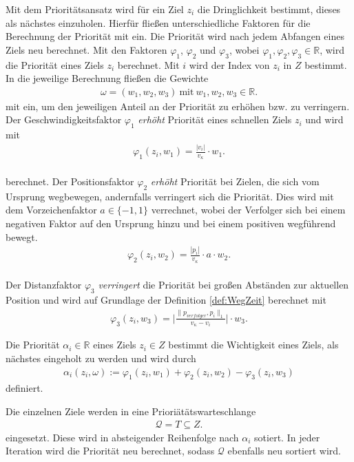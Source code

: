 \documentclass[german,version-2019-11]{uzl-thesis}
\begin{document}
Mit dem Prioritätsansatz wird für ein Ziel $z_i$ die Dringlichkeit bestimmt, dieses als nächstes einzuholen. Hierfür fließen unterschiedliche Faktoren für die Berechnung der Priorität mit ein. Die Priorität wird nach jedem Abfangen eines Ziels neu berechnet. Mit den Faktoren $\varphi_1$, $\varphi_2$ und $\varphi_3$, wobei $\varphi_1,\varphi_2,\varphi_3\in\mathbb{R}$, wird die Priorität eines Ziels $z_i$ berechnet. Mit $i$ wird der Index von $z_i$ in $Z$ bestimmt. In die jeweilige Berechnung fließen die Gewichte
\begin{align*}
\omega = (w_1, w_2 ,w_3)~\text{mit}~w_1,w_2,w_3\in\mathbb{R}.
\end{align*}
mit ein, um den jeweiligen Anteil an der Priorität zu erhöhen bzw. zu verringern.\\
Der Geschwindigkeitsfaktor $\varphi_1$ \emph{erhöht} Priorität eines schnellen Ziels $z_i$ und wird mit 
\begin{align}
\varphi_1(z_i, w_1) = \frac{|v_i|}{v_{\kappa}}\cdot w_1.
\end{align}\\
berechnet.
\label{def:FaktorPos}
Der Positionsfaktor $\varphi_2$ \emph{erhöht} Priorität bei Zielen, die sich vom Ursprung wegbewegen, andernfalls verringert sich die Priorität. Dies wird mit dem Vorzeichenfaktor $a\in\{-1,1\}$ verrechnet, wobei der Verfolger sich bei einem negativen Faktor auf den Ursprung hinzu und bei einem positiven wegführend bewegt.
\begin{align}
\varphi_2(z_i, w_2) = \frac{|p_i|}{v_{\kappa}}\cdot a \cdot w_2.
\end{align}\\
Der Distanzfaktor $\varphi_3$ \emph{verringert} die Priorität bei großen Abständen zur aktuellen Position und wird auf Grundlage der Definition \ref{def:WegZeit} berechnet mit
\begin{align}
\varphi_3(z_i, w_3) = \bigg\vert\frac{\|p_{verfolger},p_i\|_1}{v_{\kappa}-v_i}\bigg\vert \cdot w_3.
\end{align}
\begin{definition}
Die Priorität $\alpha_i\in\mathbb{R}$ eines Ziels $z_i\in Z$ bestimmt die Wichtigkeit eines Ziels, als nächstes eingeholt zu werden und wird durch
\begin{align*}
\alpha_i(z_i, \omega) := \varphi_1(z_i,w_1) + \varphi_2(z_i,w_2) - \varphi_3(z_i,w_3)
\end{align*}
definiert.
\end{definition}\noindent
Die einzelnen Ziele werden in eine Prioriätätswarteschlange
\begin{align*}
\mathcal{Q} = T\subseteq Z.
\end{align*}
eingesetzt. Diese wird in absteigender Reihenfolge nach $\alpha_i$ sotiert. In jeder Iteration wird die Priorität neu berechnet, sodass $\mathcal{Q}$ ebenfalls neu sortiert wird.
\end{document}
